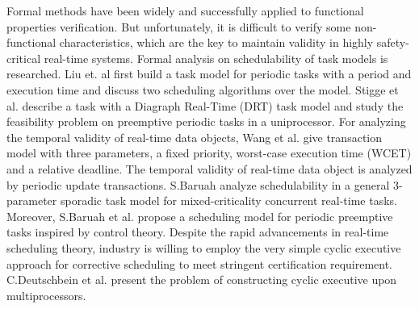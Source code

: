 \documentclass[10pt,conference]{IEEEtran}
\begin{document}
Formal methods have been widely and successfully applied to functional properties verification. But unfortunately, it is difficult to verify some non-functional characteristics, which are the key to maintain validity in highly safety-critical real-time systems. Formal analysis on schedulability of task models is researched. Liu et. al \cite{DBLP:journals/jacm/LiuL73} first build a task model for periodic tasks with a period and execution time and discuss two scheduling algorithms over the model. Stigge et al. \cite{DBLP:conf/rtas/StiggeEGY11} describe a task with a Diagraph Real-Time (DRT) task model and study the feasibility problem on preemptive periodic tasks in a uniprocessor. For analyzing the temporal validity of real-time data objects, Wang et al. \cite{DBLP:journals/computing/WangLHSM13} give transaction model with three parameters, a fixed priority, worst-case execution time (WCET) and a relative deadline. The temporal validity of real-time data object is analyzed by periodic update transactions. S.Baruah \cite{DBLP:conf/rtss/Baruah16} analyze schedulability in a general 3-parameter sporadic task model \cite{DBLP:journals/csur/BurnsD17} for mixed-criticality concurrent real-time tasks. Moreover, S.Baruah et al. \cite{DBLP:conf/rtns/2017} propose a scheduling model for periodic preemptive tasks inspired by control theory. Despite the rapid advancements in real-time scheduling theory, industry is willing to employ the very simple cyclic executive approach \cite{DBLP:journals/rts/BakerS89} for corrective scheduling to meet stringent certification requirement. C.Deutschbein et al. \cite{DBLP:conf/setta/2017} present the problem of constructing cyclic executive upon multiprocessors.
\end{document}
